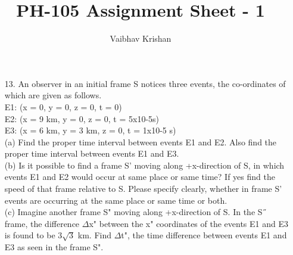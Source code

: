 \documentclass[10pt, a4paper]{article}
\begin{document}
\title{PH-105 Assignment Sheet - 1}
\author{Vaibhav Krishan}
\date{}
\maketitle
\begin{enumerate}
\item[13.]{ An observer in an initial frame S notices three events, the co-ordinates of which are given as follows.\\
E1: (x = 0, y = 0, z = 0, t = 0)\\
E2: (x = 9 km, y = 0, z = 0, t = 5x10-5s)\\
E3: (x = 6 km, y = 3 km, z = 0, t = 1x10-5 s)\\
(a) Find the proper time interval between events E1 and E2.  Also find the proper time interval between events E1 and E3.\\
(b) Is it possible to find a frame S’ moving along +x-direction of S, in which events E1 and E2 would occur at same place or same time? If yes find the speed of that frame relative to S. Please specify clearly, whether in frame S’ events are occurring at the same place or same time or both. \\
(c) Imagine another frame S" moving along +x-direction of S. In the S˝ frame, the difference \begin{math} \Delta \end{math}x" between the x" coordinates of the events E1 and E3 is found to be \begin{math} 3\sqrt 3\end{math} km. Find \begin{math} \Delta \end{math}t", the time difference between events E1 and E3 as seen in the frame S".\\


}
\end{enumerate}
\end{document}
